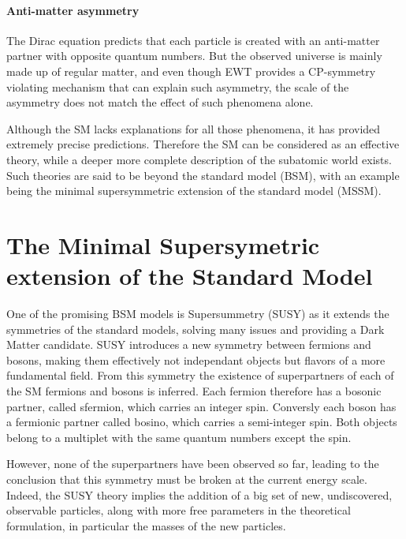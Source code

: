 \paragraph{Anti-matter asymmetry} The Dirac equation predicts that each particle is created with an anti-matter partner with opposite quantum numbers. But the observed universe is mainly made up of regular matter, and even though EWT provides a CP-symmetry violating mechanism that can explain such asymmetry, the scale of the asymmetry does not match the effect of such phenomena alone.\newline

Although the SM lacks explanations for all those phenomena, it has provided extremely precise predictions. Therefore the SM can be considered as an effective theory, while a deeper more complete description of the subatomic world exists. Such theories are said to be beyond the standard model (BSM), with an example being the minimal supersymmetric extension of the standard model (MSSM).


\section{The Minimal Supersymetric extension of the Standard Model}
\label{sec:MSSM}

One of the promising BSM models is Supersummetry (SUSY) as it extends the symmetries of the standard models, solving many issues and providing a Dark Matter candidate. SUSY \cite{Martin:1997ns} introduces a new symmetry between fermions and bosons, making them effectively not independant objects but flavors of a more fundamental field. From this symmetry the existence of superpartners of each of the SM fermions and bosons is inferred. Each fermion therefore has a bosonic partner, called sfermion, which carries an integer spin. Conversly each boson has a fermionic partner called bosino, which carries a semi-integer spin. Both objects belong to a multiplet with the same quantum numbers except the spin.\newline

However, none of the superpartners have been observed so far, leading to the conclusion that this symmetry must be broken at the current energy scale. Indeed, the SUSY theory implies the addition of a big set of new, undiscovered, observable particles, along with more free parameters in the theoretical formulation, in particular the masses of the new particles.\newline

